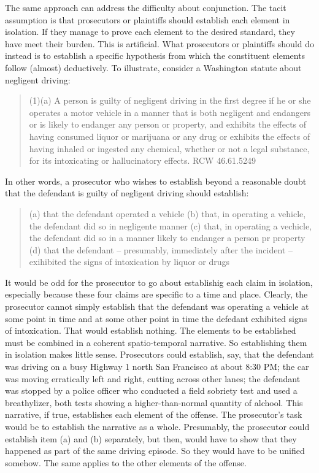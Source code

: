 \documentclass[10pt,dvipsnames,enabledeprecatedfontcommands]{scrartcl}
\begin{document}
The same approach can address the difficulty about conjunction. The
tacit assumption is that prosecutors or plaintiffs should establish each
element in isolation. If they manage to prove each element to the
desired standard, they have meet their burden. This is artificial. What
prosecutors or plaintiffs should do instead is to establish a specific
hypothesis from which the constituent elements follow (almost)
deductively. To illustrate, consider a Washington statute about
negligent driving:

\begin{quote}
(1)(a) A person is guilty of negligent driving in the first degree if he or she operates a motor vehicle in a manner that is both negligent and endangers or is likely to endanger any person or property, and exhibits the effects of having consumed liquor or marijuana or any drug or exhibits the effects of having inhaled or ingested any chemical, whether or not a legal substance, for its intoxicating or hallucinatory effects. RCW 46.61.5249
\end{quote}

\noindent
In other words, a prosecutor who wishes to establish beyond a reasonable
doubt that the defendant is guilty of negligent driving should
establish:

\begin{quote}
(a) that the defendant operated a vehicle
(b) that, in operating a vehicle, the defendant did so in  negligente manner
(c) that, in operating a vechicle, the defendant did so in a manner likely to endanger a person pr property
(d) that the defendant -- presumably, immediately after the incident -- exihibited the signs of intoxication by liquor or drugs
\end{quote}

\noindent
It would be odd for the prosecutor to go about establishig each claim in
isolation, especially because these four claims are specific to a time
and place. Clearly, the prosecutor cannot simply establish that the
defendant was operating a vehicle at some point in time and at some
other point in time the defedant exhibited signs of intoxication. That
would establish nothing. The elements to be established must be combined
in a coherent spatio-temporal narrative. So establishing them in
isolation makes little sense. Prosecutors could establish, say, that the
defendant was driving on a busy Highway 1 north San Francisco at about
8:30 PM; the car was moving erratically left and right, cutting across
other lanes; the defendant was stopped by a police officer who conducted
a field sobriety test and used a breathylizer, both tests showing a
higher-than-normal quantity of alchool. This narrative, if true,
establishes each element of the offense. The prosecutor's task would be
to establish the narrative as a whole. Presumably, the prosecutor could
establish item (a) and (b) separately, but then, would have to show that
they happened as part of the same driving episode. So they would have to
be unified somehow. The same applies to the other elements of the
offense.
\end{document}
